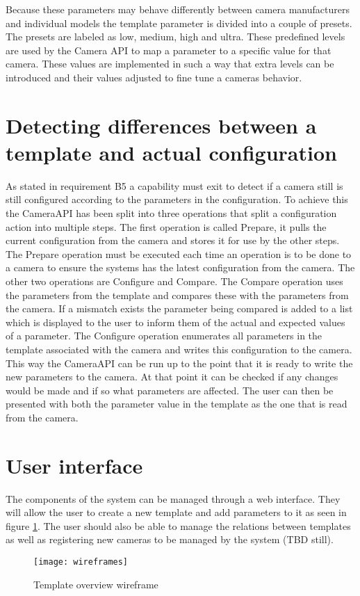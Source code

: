 Because these parameters may behave differently between camera manufacturers and individual models the template parameter is divided into a couple of presets. The presets are labeled as low, medium, high and ultra. These predefined levels are used by the Camera API to map a parameter to a specific value for that camera. These values are implemented in such a way that extra levels can be introduced and their values adjusted to fine tune a cameras behavior.

\section{Detecting differences between a template and actual configuration}
As stated in requirement B5 a capability must exit to detect if a camera still is still configured according to the parameters in the configuration.
To achieve this the CameraAPI has been split into three operations that split a configuration action into multiple steps.
The first operation is called Prepare, it pulls the current configuration from the camera and stores it for use by the other steps.
The Prepare operation must be executed each time an operation is to be done to a camera to ensure the systems has the latest configuration from the camera.
The other two operations are Configure and Compare.
The Compare operation uses the parameters from the template and compares these with the parameters from the camera.
If a mismatch exists the parameter being compared is added to a list which is displayed to the user to inform them of the actual and expected values of a parameter.
The Configure operation enumerates all parameters in the template associated with the camera and writes this configuration to the camera.
This way the CameraAPI can be run up to the point that it is ready to write the new parameters to the camera.
At that point it can be checked if any changes would be made and if so what parameters are affected.
The user can then be presented with both the parameter value in the template as the one that is read from the camera.

\section{User interface}
The components of the system can be managed through a web interface.
They will allow the user to create a new template and add parameters to it as seen in figure \ref{fig:templatewireframe}.
The user should also be able to manage the relations between templates as well as registering new cameras to be managed by the system (TBD still).
\begin{figure}[h!]
	\centering
	\texttt{[image: wireframes]}
	\caption{Template overview  wireframe}
	\label{fig:templatewireframe}
\end{figure}

